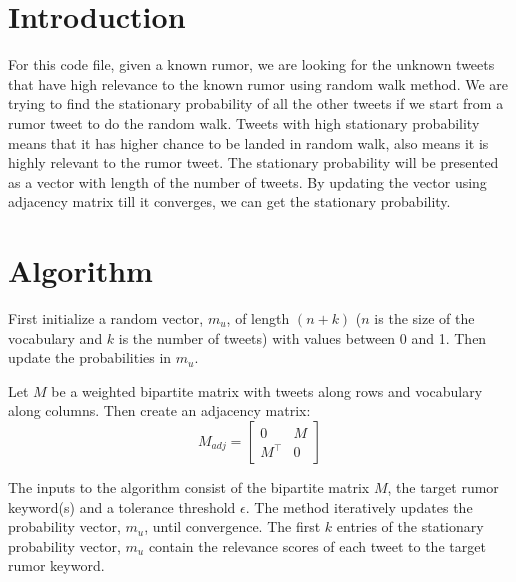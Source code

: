 \documentclass{article}
\begin{document}
\section*{Introduction}
For this code file, given a known rumor, we are looking for the unknown tweets that have high relevance to the known rumor using random walk method. We are trying to find the stationary probability of all the other tweets if we start from a rumor tweet to do the random walk. Tweets with high stationary probability means that it has higher chance to be landed in random walk, also means it is highly relevant to the rumor tweet. The stationary probability will be presented as a vector with length of the number of tweets. By updating the vector using adjacency matrix till it converges, we can get the stationary probability.

\section*{Algorithm}
First initialize a random vector, $m_u$, of length $(n + k)$ ($n$ is the size of the vocabulary and $k$ is the number of tweets) with values between 0 and 1. Then update the probabilities in $m_u$. 

Let $M$ be a weighted bipartite matrix with tweets along rows and vocabulary along columns. Then create an adjacency matrix:
\[
  M_{adj} = \left[
    \begin{array}{cc}
      0 & M \\
      M^\top & 0
    \end{array}
  \right]
\]

The inputs to the algorithm consist of the bipartite matrix $M$, the target rumor keyword(s) and a tolerance threshold $\epsilon$. The method iteratively updates the probability vector, $m_u$, until convergence. The first $k$ entries of the stationary probability vector, $m_u$ contain the relevance scores of each tweet to the target rumor keyword.
\end{document}

